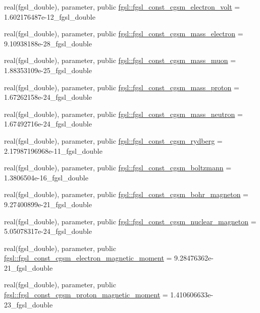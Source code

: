 \begin{DoxyCompactItemize}
\item 
real(fgsl\+\_\+double), parameter, public \hyperlink{namespacefgsl_aeec1dd933fc3bc5a582363056455d46c}{fgsl\+::fgsl\+\_\+const\+\_\+cgsm\+\_\+electron\+\_\+volt} = 1.\+602176487e-\/12\+\_\+fgsl\+\_\+double
\item 
real(fgsl\+\_\+double), parameter, public \hyperlink{namespacefgsl_a8b5c993b964f03b76098558c24095fd4}{fgsl\+::fgsl\+\_\+const\+\_\+cgsm\+\_\+mass\+\_\+electron} = 9.\+10938188e-\/28\+\_\+fgsl\+\_\+double
\item 
real(fgsl\+\_\+double), parameter, public \hyperlink{namespacefgsl_a3092e1888259499b77e1dc358db86c58}{fgsl\+::fgsl\+\_\+const\+\_\+cgsm\+\_\+mass\+\_\+muon} = 1.\+88353109e-\/25\+\_\+fgsl\+\_\+double
\item 
real(fgsl\+\_\+double), parameter, public \hyperlink{namespacefgsl_aefda043fac3adf36e5c9142193d24ef6}{fgsl\+::fgsl\+\_\+const\+\_\+cgsm\+\_\+mass\+\_\+proton} = 1.\+67262158e-\/24\+\_\+fgsl\+\_\+double
\item 
real(fgsl\+\_\+double), parameter, public \hyperlink{namespacefgsl_aa4c1d627604e0ff04d68a92847dc1a00}{fgsl\+::fgsl\+\_\+const\+\_\+cgsm\+\_\+mass\+\_\+neutron} = 1.\+67492716e-\/24\+\_\+fgsl\+\_\+double
\item 
real(fgsl\+\_\+double), parameter, public \hyperlink{namespacefgsl_a0f2cb7b75a4fd58c54e5a0b794da13b6}{fgsl\+::fgsl\+\_\+const\+\_\+cgsm\+\_\+rydberg} = 2.\+17987196968e-\/11\+\_\+fgsl\+\_\+double
\item 
real(fgsl\+\_\+double), parameter, public \hyperlink{namespacefgsl_abe34761700d2098a3dcde1e962938eb4}{fgsl\+::fgsl\+\_\+const\+\_\+cgsm\+\_\+boltzmann} = 1.\+3806504e-\/16\+\_\+fgsl\+\_\+double
\item 
real(fgsl\+\_\+double), parameter, public \hyperlink{namespacefgsl_a106f93e7068726bf01947287eb77faed}{fgsl\+::fgsl\+\_\+const\+\_\+cgsm\+\_\+bohr\+\_\+magneton} = 9.\+27400899e-\/21\+\_\+fgsl\+\_\+double
\item 
real(fgsl\+\_\+double), parameter, public \hyperlink{namespacefgsl_a31fef82c84b5351ce89d573f6be1eb8f}{fgsl\+::fgsl\+\_\+const\+\_\+cgsm\+\_\+nuclear\+\_\+magneton} = 5.\+05078317e-\/24\+\_\+fgsl\+\_\+double
\item 
real(fgsl\+\_\+double), parameter, public \hyperlink{namespacefgsl_aeef2a928302f3601b87ba01c486de9bd}{fgsl\+::fgsl\+\_\+const\+\_\+cgsm\+\_\+electron\+\_\+magnetic\+\_\+moment} = 9.\+28476362e-\/21\+\_\+fgsl\+\_\+double
\item 
real(fgsl\+\_\+double), parameter, public \hyperlink{namespacefgsl_a91a53064c6d7b4c8af4bf3368a896d74}{fgsl\+::fgsl\+\_\+const\+\_\+cgsm\+\_\+proton\+\_\+magnetic\+\_\+moment} = 1.\+410606633e-\/23\+\_\+fgsl\+\_\+double

\end{DoxyCompactItemize}

